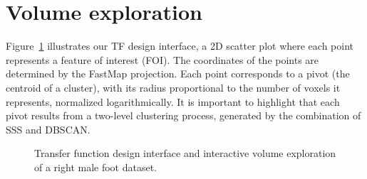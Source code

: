 \section{Volume exploration}
\label{sect:volume-exploration}

Figure~\ref{fig:tf-design-example} illustrates our TF design interface, a 2D scatter plot where each point represents a feature of interest (FOI). The coordinates of the points are determined by the FastMap projection. Each point corresponds to a pivot (the centroid of a cluster), with its radius proportional to the number of voxels it represents, normalized logarithmically. It is important to highlight that each pivot results from a two-level clustering process, generated by the combination of SSS and DBSCAN.

\begin{figure}[htb!]
    \centering
    \hfill
    \caption{Transfer function design interface and interactive volume exploration of a right male foot dataset.}
    \label{fig:tf-design-example}
\end{figure}

